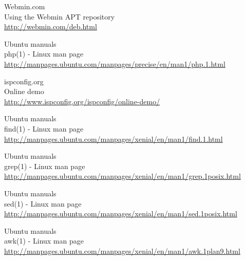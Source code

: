 \begin{thebibliography}{10}
Webmin.com\\
Using the Webmin APT repository\\
  \url{http://webmin.com/deb.html}

Ubuntu manuals\\
php(1) - Linux man page\\
  \url{http://manpages.ubuntu.com/manpages/precise/en/man1/php.1.html}

ispconfig.org\\
Online demo\\
  \url{http://www.ispconfig.org/ispconfig/online-demo/}

Ubuntu manuals\\
find(1) - Linux man page\\
  \url{http://manpages.ubuntu.com/manpages/xenial/en/man1/find.1.html}

Ubuntu manuals\\
grep(1) - Linux man page\\
  \url{http://manpages.ubuntu.com/manpages/xenial/en/man1/grep.1posix.html}

Ubuntu manuals\\
sed(1) - Linux man page\\
  \url{http://manpages.ubuntu.com/manpages/xenial/en/man1/sed.1posix.html}

Ubuntu manuals\\
awk(1) - Linux man page\\
  \url{http://manpages.ubuntu.com/manpages/xenial/en/man1/awk.1plan9.html}

\end{thebibliography}
